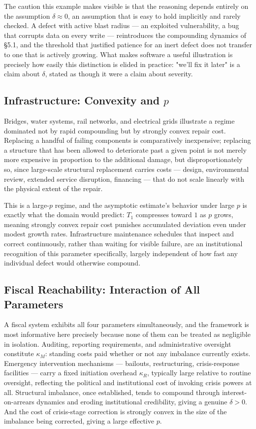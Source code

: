 \documentclass[11pt]{article}
\begin{document}
The caution this example makes visible is that the reasoning depends entirely on the assumption $\delta \approx 0$, an assumption that is easy to hold implicitly and rarely checked. A defect with active blast radius — an exploited vulnerability, a bug that corrupts data on every write — reintroduces the compounding dynamics of \S 5.1, and the threshold that justified patience for an inert defect does not transfer to one that is actively growing. What makes software a useful illustration is precisely how easily this distinction is elided in practice: "we'll fix it later" is a claim about $\delta$, stated as though it were a claim about severity.

\subsection{Infrastructure: Convexity and $p$}

Bridges, water systems, rail networks, and electrical grids illustrate a regime dominated not by rapid compounding but by strongly convex repair cost. Replacing a handful of failing components is comparatively inexpensive; replacing a structure that has been allowed to deteriorate past a given point is not merely more expensive in proportion to the additional damage, but disproportionately so, since large-scale structural replacement carries costs — design, environmental review, extended service disruption, financing — that do not scale linearly with the physical extent of the repair.

This is a large-$p$ regime, and the asymptotic estimate's behavior under large $p$ is exactly what the domain would predict: $T_1$ compresses toward $1$ as $p$ grows, meaning strongly convex repair cost punishes accumulated deviation even under modest growth rates. Infrastructure maintenance schedules that inspect and correct continuously, rather than waiting for visible failure, are an institutional recognition of this parameter specifically, largely independent of how fast any individual defect would otherwise compound.

\subsection{Fiscal Reachability: Interaction of All Parameters}

A fiscal system exhibits all four parameters simultaneously, and the framework is most informative here precisely because none of them can be treated as negligible in isolation. Auditing, reporting requirements, and administrative oversight constitute $\kappa_M$: standing costs paid whether or not any imbalance currently exists. Emergency intervention mechanisms — bailouts, restructuring, crisis-response facilities — carry a fixed initiation overhead $\kappa_R$, typically large relative to routine oversight, reflecting the political and institutional cost of invoking crisis powers at all. Structural imbalance, once established, tends to compound through interest-on-arrears dynamics and eroding institutional credibility, giving a genuine $\delta > 0$. And the cost of crisis-stage correction is strongly convex in the size of the imbalance being corrected, giving a large effective $p$.
\end{document}
